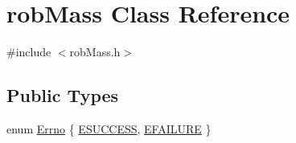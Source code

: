 \hypertarget{classrob_mass}{\section{rob\-Mass Class Reference}
\label{classrob_mass}
}


{\ttfamily \#include $<$rob\-Mass.\-h$>$}

\subsection*{Public Types}
\begin{DoxyCompactItemize}
\item 
enum \hyperlink{classrob_mass_a85e715c568a7c8b1fff957b046164649}{Errno} \{ \hyperlink{classrob_mass_a85e715c568a7c8b1fff957b046164649add68e16ef430713d59f0adb01b14b94e}{E\-S\-U\-C\-C\-E\-S\-S}, 
\hyperlink{classrob_mass_a85e715c568a7c8b1fff957b046164649a73f4b04ad9d26f8bd81f6bdc9cee9a66}{E\-F\-A\-I\-L\-U\-R\-E}
 \}
\end{DoxyCompactItemize}
